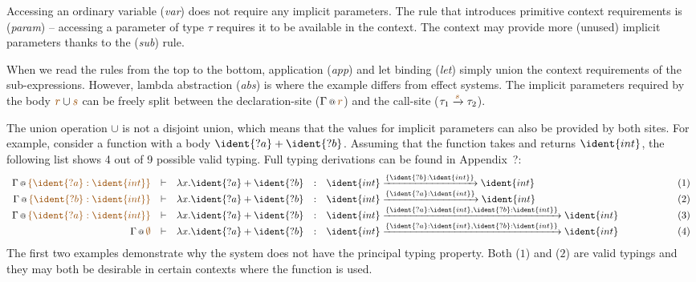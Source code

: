 Accessing an ordinary variable (\emph{var}) does not require any implicit parameters. The rule that 
introduces primitive context requirements is (\emph{param}) -- accessing a parameter  
of type $\tau$ requires it to be available in the context. The context may provide more (unused) 
implicit parameters thanks to the (\emph{sub}) rule.

When we read the rules from the top to the bottom, application (\emph{app}) and let binding 
(\emph{let}) simply union the context requirements of the sub-expressions. However, lambda abstraction
(\emph{abs}) is where the example differs from effect systems. The implicit parameters required by
the body $\aclrd{r} \cup \aclrd{s}$ can be freely split between the declaration-site ($\coctx{\Gamma}{\aclrd{r}}$)
and the call-site ($\tau_1 \xrightarrow{\aclrd{s}} \tau_2$).

The union operation $\cup$ is not a disjoint union, which means that the values for implicit 
parameters can also be provided by both sites. For example, consider a function with a body
$\ident{?a} + \ident{?b}$. Assuming that the function takes and returns $\ident{int}$, the following
list shows 4 out of 9 possible valid typing. Full typing derivations can be found in Appendix~?:
%
\begin{equation*}
\begin{array}{rcllllr}
\coctx{\Gamma}{\aclrd{ \{ \ident{?a}:\ident{int} \} }} &\vdash& \lambda x.\ident{?a} + \ident{?b} &:& 
  \ident{int} \xrightarrow{ \{ \ident{?b}:\ident{int} \} } \ident{int} &\qquad\qquad&(1) \\
\coctx{\Gamma}{\aclrd{ \{ \ident{?b}:\ident{int} \} }} &\vdash& \lambda x.\ident{?a} + \ident{?b} &:& 
  \ident{int} \xrightarrow{ \{ \ident{?a}:\ident{int} \} } \ident{int} &&(2)\\
\coctx{\Gamma}{\aclrd{ \{\ident{?a}:\ident{int} \} }} &\vdash& \lambda x.\ident{?a} + \ident{?b} &:& 
  \ident{int} \xrightarrow{ \{\ident{?a}:\ident{int}, \ident{?b}:\ident{int} \} } \ident{int} &&(3)\\
\coctx{\Gamma}{\aclrd{ \emptyset }} &\vdash& \lambda x.\ident{?a} + \ident{?b} &:& 
  \ident{int} \xrightarrow{ \{\ident{?a}:\ident{int}, \ident{?b}:\ident{int} \} } \ident{int} &&(4)
\end{array}
\end{equation*}
%
The first two examples demonstrate why the system does not have the principal typing property. 
Both ($1$) and ($2$) are valid typings and they may both be desirable in certain contexts where
the function is used. 

